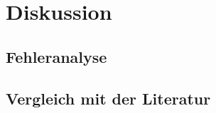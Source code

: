 \section{Diskussion}
\label{sec:Diskussion}

\subsection{Fehleranalyse}

\subsection{Vergleich mit der Literatur}